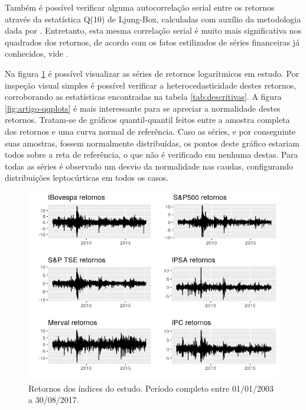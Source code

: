\documentclass[1p]{elsarticle}
\theoremstyle{definition}
\begin{document}
Também é possível verificar alguma autocorrelação serial entre os retornos através da estatística Q(10) de Ljung-Box, calculadas com auxílio da metodologia dada por \cite{Fisher2012}. Entretanto, esta mesma correlação serial é muito mais significativa nos quadrados dos retornos, de acordo com os fatos estilizados de séries financeiras já conhecidos, vide \cite{Cont2001}.



Na figura \ref{fig:artigo-retornos} é possível visualizar as séries de retornos logarítmicos em estudo. Por inspeção visual simples é possível verificar a heterocedasticidade destes retornos, corroborando as estatísticas encontradas na tabela \ref{tab:descritivas}. A figura \ref{fig:artigo-qqplots} é mais interessante para se apreciar a normalidade destes retornos. Tratam-se de gráficos quantil-quantil feitos entre a amostra completa dos retornos e uma curva normal de referência. Caso as séries, e por conseguinte suas amostras, fossem normalmente distribuídas, os pontos deste gráfico estariam todos sobre a reta de referência, o que não é verificado em nenhuma destas. Para todas as séries é observado um desvio da normalidade nas caudas, configurando distribuições leptocúrticas em todos os casos.

\begin{figure}[H]
	\centering
	\includegraphics[width=1\linewidth]{figs/artigo-retornos}
	\caption{Retornos dos índices do estudo. Período completo entre 01/01/2003 a 30/08/2017.}
	\label{fig:artigo-retornos}
\end{figure}
\end{document}
